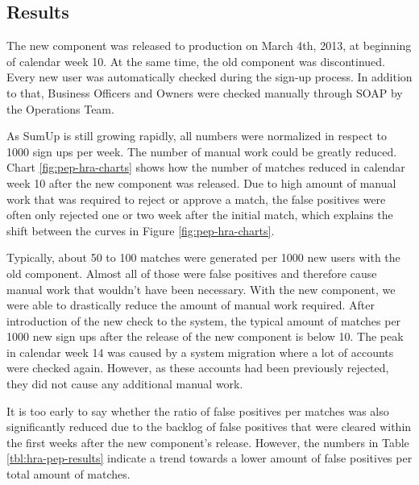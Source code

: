 \documentclass[a4paper, oneside]{csthesis}
\begin{document}
\subsection{Results}

The new component was released to production on March 4th, 2013, at beginning of calendar week 10. At the same time, the old component was discontinued. Every new user was automatically checked during the sign-up process. In addition to that, Business Officers and Owners were checked manually through SOAP by the Operations Team.

As SumUp is still growing rapidly, all numbers were normalized in respect to 1000 sign ups per week. The number of manual work could be greatly reduced. Chart \ref{fig:pep-hra-charts} shows how the number of matches reduced in calendar week 10 after the new component was released.
Due to high amount of manual work that was required to reject or approve a match, the false positives were often only rejected one or two week after the initial match, which explains the shift between the curves in Figure \ref{fig:pep-hra-charts}.

Typically, about 50 to 100 matches were generated per 1000 new users with the old component. Almost all of those were false positives and therefore cause manual work that wouldn't have been necessary. With the new component, we were able to drastically reduce the amount of manual work required. After introduction of the new check to the system, the typical amount of matches per 1000 new sign ups after the release of the new component is below 10. The peak in calendar week 14 was caused by a system migration where a lot of accounts were checked again. However, as these accounts had been previously rejected, they did not cause any additional manual work.

It is too early to say whether the ratio of false positives per matches was also significantly reduced due to the backlog of false positives that were cleared within the first weeks after the new component's release. However, the numbers in Table \ref{tbl:hra-pep-results} indicate a trend towards a lower amount of false positives per total amount of matches.
\end{document}
